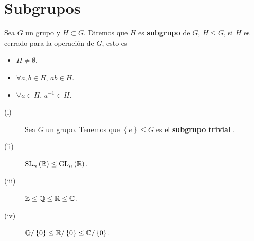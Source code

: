 \section{Subgrupos}
\begin{definition}[Subgrupo]
Sea $\displaystyle G $ un grupo y $\displaystyle H \subset G $. Diremos que $\displaystyle H $ es \textbf{subgrupo} de $\displaystyle G $, $\displaystyle H \leq G $, si $\displaystyle H $ es cerrado para la operación de $\displaystyle G $, esto es
\begin{itemize}
\item $\displaystyle H \neq \emptyset $.
\item $\displaystyle \forall a,b \in H $, $\displaystyle ab \in H $.
\item $\displaystyle \forall a \in H $, $\displaystyle a^{-1} \in H $.
\end{itemize}
\end{definition}
\begin{eg}
\begin{description}
	\item[(i)] Sea $\displaystyle G $ un grupo. Tenemos que $\displaystyle \left\{ e\right\} \leq G $ es el \textbf{subgrupo trivial} .
	\item[(ii)] $\displaystyle \operatorname{SL}_{n}\left(\mathbb{R}\right) \leq \operatorname{GL}_{n}\left(\mathbb{R}\right) $.
	\item[(iii)] $\displaystyle \mathbb{Z} \leq \mathbb{Q} \leq \mathbb{R} \leq \mathbb{C} $.
	\item[(iv)] $\displaystyle \mathbb{Q}/ \left\{ 0\right\}  \leq \mathbb{R}/ \left\{ 0\right\}  \leq \mathbb{C} / \left\{ 0\right\}  $.
\end{description}
\end{eg}

